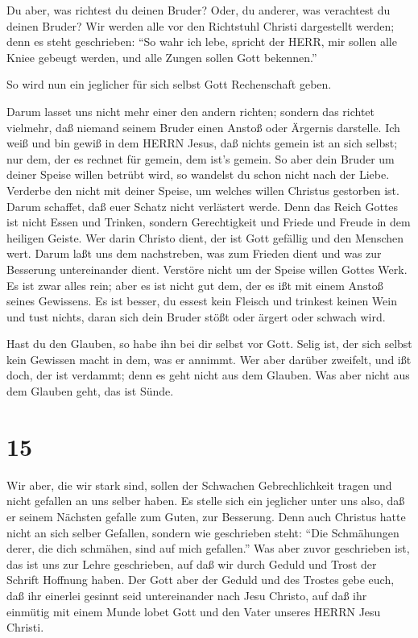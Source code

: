  Du aber, was richtest du deinen Bruder? Oder, du anderer,
was verachtest du deinen Bruder? Wir werden alle vor den Richtstuhl
Christi dargestellt werden;  denn es steht geschrieben:
``So wahr ich lebe, spricht der HERR, mir sollen alle Kniee gebeugt
werden, und alle Zungen sollen Gott bekennen.''

 So wird nun ein jeglicher für sich selbst Gott
Rechenschaft geben.

 Darum lasset uns nicht mehr einer den andern richten;
sondern das richtet vielmehr, daß niemand seinem Bruder einen Anstoß
oder Ärgernis darstelle.  Ich weiß und bin gewiß in dem
HERRN Jesus, daß nichts gemein ist an sich selbst; nur dem, der es
rechnet für gemein, dem ist's gemein.  So aber dein Bruder
um deiner Speise willen betrübt wird, so wandelst du schon nicht nach
der Liebe. Verderbe den nicht mit deiner Speise, um welches willen
Christus gestorben ist.  Darum schaffet, daß euer Schatz
nicht verlästert werde.  Denn das Reich Gottes ist nicht
Essen und Trinken, sondern Gerechtigkeit und Friede und Freude in dem
heiligen Geiste.  Wer darin Christo dient, der ist Gott
gefällig und den Menschen wert.  Darum laßt uns dem
nachstreben, was zum Frieden dient und was zur Besserung untereinander
dient.  Verstöre nicht um der Speise willen Gottes Werk. Es
ist zwar alles rein; aber es ist nicht gut dem, der es ißt mit einem
Anstoß seines Gewissens.  Es ist besser, du essest kein
Fleisch und trinkest keinen Wein und tust nichts, daran sich dein Bruder
stößt oder ärgert oder schwach wird.

 Hast du den Glauben, so habe ihn bei dir selbst vor Gott.
Selig ist, der sich selbst kein Gewissen macht in dem, was er annimmt.
 Wer aber darüber zweifelt, und ißt doch, der ist verdammt;
denn es geht nicht aus dem Glauben. Was aber nicht aus dem Glauben geht,
das ist Sünde.

\hypertarget{section-14}{%
\section{15}\label{section-14}}

 Wir aber, die wir stark sind, sollen der Schwachen
Gebrechlichkeit tragen und nicht gefallen an uns selber haben.
 Es stelle sich ein jeglicher unter uns also, daß er seinem
Nächsten gefalle zum Guten, zur Besserung.  Denn auch
Christus hatte nicht an sich selber Gefallen, sondern wie geschrieben
steht: ``Die Schmähungen derer, die dich schmähen, sind auf mich
gefallen.''  Was aber zuvor geschrieben ist, das ist uns zur
Lehre geschrieben, auf daß wir durch Geduld und Trost der Schrift
Hoffnung haben.  Der Gott aber der Geduld und des Trostes
gebe euch, daß ihr einerlei gesinnt seid untereinander nach Jesu
Christo,  auf daß ihr einmütig mit einem Munde lobet Gott
und den Vater unseres HERRN Jesu Christi.

